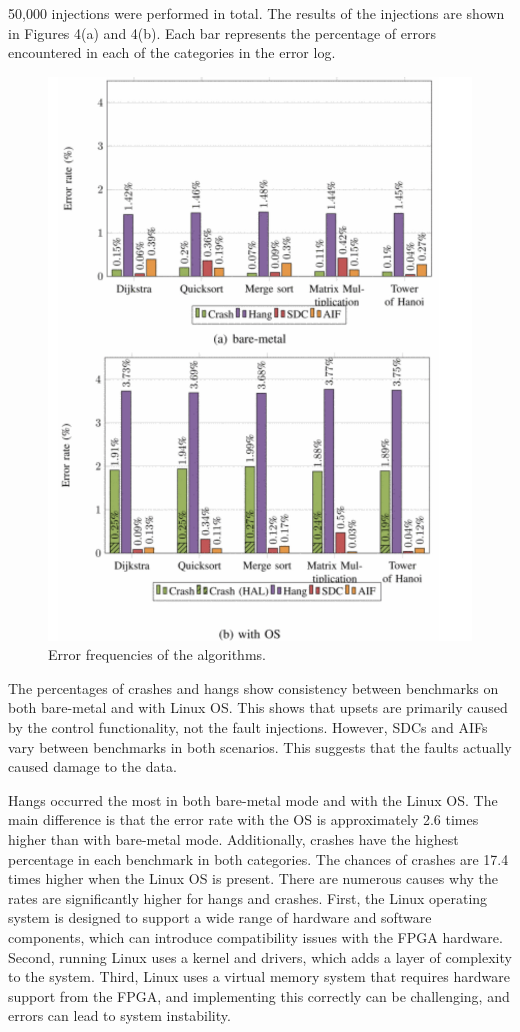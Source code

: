\documentclass[conference]{IEEEtran}
\begin{document}
50,000 injections were performed in total. The results of the injections are shown in Figures 4(a) and 4(b). Each bar represents the percentage 
of errors encountered in each of the categories in the error log. 
\begin{figure}[ht]
    \centering
    \includegraphics[scale = 0.2]{results.jpg}
    \caption{Error frequencies of the algorithms.}
\end{figure}
The percentages of crashes and hangs show consistency between benchmarks on both bare-metal and with Linux OS. This shows that upsets are 
primarily caused by the control functionality, not the fault injections. However, SDCs and AIFs vary between benchmarks in both scenarios. 
This suggests that the faults actually caused damage to the data. 

Hangs occurred the most in both bare-metal mode and with the Linux OS. The main difference is that the error rate with the OS is 
approximately 2.6 times higher than with bare-metal mode. Additionally, crashes have the highest percentage in each benchmark in both categories. 
The chances of crashes are 17.4 times higher when the Linux OS is present. There are numerous causes why the rates are significantly higher for
hangs and crashes. First, the Linux operating system is designed to support a wide range of hardware and software components, which can introduce 
compatibility issues with the FPGA hardware. Second, running Linux uses a kernel and drivers, which adds a layer of complexity to the system. 
Third, Linux uses a virtual memory system that requires hardware support from the FPGA, and implementing this correctly can be challenging, and 
errors can lead to system instability.
\end{document}
